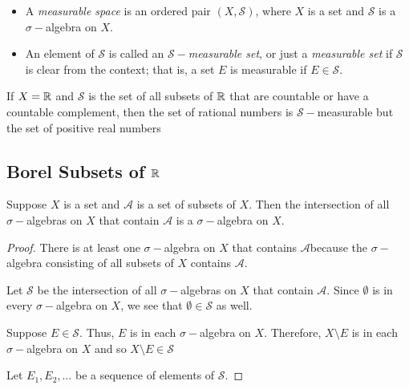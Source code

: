\documentclass[11pt,a4paper]{book}
\begin{document}
\begin{definition}
    \begin{itemize}
        \item A \textit{measurable space} is an ordered pair \( (X, \mathcal{S}) \), where \( X  \) is a set and \( \mathcal{S} \) is a \( \sigma- \)algebra on \( X  \).
        \item An element of \( \mathcal{S} \) is called an \textit{ \( \mathcal{S}- \)measurable set}, or just a \textit{measurable set} if \( \mathcal{S} \) is clear from the context; that is, a set \( E\) is measurable if \( E \in \mathcal{S}   \).
    \end{itemize}
\end{definition}

\begin{eg}
  If \( X = \mathbb{R}  \) and \( \mathcal{S} \) is the set of all subsets of \( \mathbb{R}  \) that are countable or have a countable complement, then the set of rational numbers is \( \mathcal{S}- \)measurable but the set of positive real numbers 
\end{eg}

\subsection{Borel Subsets of \( \mathbb{R}  \)}

\begin{prop}
   Suppose \( X  \) is a set and \( \mathcal{A} \) is a set of subsets of \( X  \). Then the intersection of all \( \sigma- \)algebras on \( X  \) that contain \( \mathcal{A} \) is a \( \sigma- \)algebra on \( X  \). 
\end{prop}

\begin{proof}
    There is at least one \( \sigma- \)algebra on \( X  \) that contains \( \mathcal{A} \)because the \( \sigma- \)algebra consisting of all subsets of \( X  \) contains \( \mathcal{A} \). 

    Let \( \mathcal{S} \) be the intersection of all \( \sigma- \)algebras on \( X  \) that contain \( \mathcal{A} \). Since \( \emptyset  \) is in every \( \sigma- \)algebra on \( X  \), we see that \( \emptyset \in \mathcal{S} \) as well.

    Suppose \( E \in \mathcal{S} \). Thus, \( E  \) is in each \( \sigma- \)algebra on \( X  \). Therefore, \( X \setminus  E  \) is in each \( \sigma- \)algebra on \( X  \) and so \( X \setminus  E \in \mathcal{S} \)

    Let \( {E}_{1}, {E}_{2}, \dots  \) be a sequence of elements of \( \mathcal{S} \). 
\end{proof}
\end{document}
